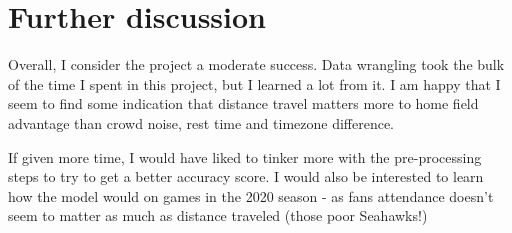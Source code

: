 \documentclass[12pt, letterpaper, twoside]{article}
\begin{document}
\section{Further discussion}

Overall, I consider the project a moderate success. Data wrangling took the bulk of the time I spent in this project, but I learned a lot from it. I am happy that I seem to find some indication that distance travel matters more to home field advantage than crowd noise, rest time and timezone difference. 

If given more time, I would have liked to tinker more with the pre-processing steps to try to get a better accuracy score. I would also be interested to learn how the model would on games in the 2020 season - as fans attendance doesn't seem to matter as much as distance traveled (those poor Seahawks!)





\end{document}

